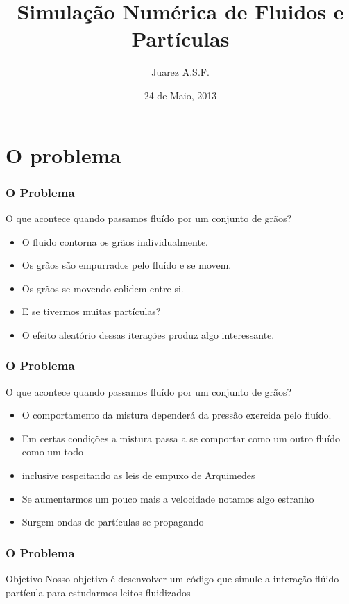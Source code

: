 \documentclass{beamer}
\title[Pibic]{Simulação Numérica de Fluidos e Partículas}
\author{Juarez A.S.F.}
\institute{UnB}
\date{24 de Maio, 2013}
\begin{document}
\begin{frame}
\titlepage
\end{frame}
\section{O problema}
\begin{frame}{}
	\frametitle{O Problema}
 
O que acontece quando passamos fluído por um conjunto de grãos?
\begin{itemize}
 \item<2-> O fluido contorna os grãos individualmente.
 \item<3-> Os grãos são empurrados pelo fluído e se movem.
 \item<4-> Os grãos se movendo colidem entre si.
 \item<5-> E se tivermos muitas partículas?
 \item<6-> O efeito aleatório dessas iterações produz algo interessante.
\end{itemize}
\end{frame}
\begin{frame}{}
	\frametitle{O Problema}
 
O que acontece quando passamos fluído por um conjunto de grãos?
\begin{itemize}
 \item<2-> O comportamento da mistura dependerá da pressão exercida pelo fluído.
 \item<3-> Em certas condições a mistura passa a se comportar como um outro fluído como um todo
 \item<4-> inclusive respeitando as leis de empuxo de Arquimedes
 \item<5-> Se aumentarmos um pouco mais a velocidade notamos algo estranho
 \item<6-> Surgem ondas de partículas se propagando
\end{itemize}
\end{frame}
\begin{frame}
	\frametitle{O Problema}
	\begin{block}{Objetivo}
		Nosso objetivo é desenvolver um código que simule a interação flúido-partícula para estudarmos leitos fluidizados
	\end{block}
\end{frame}
\end{document}
